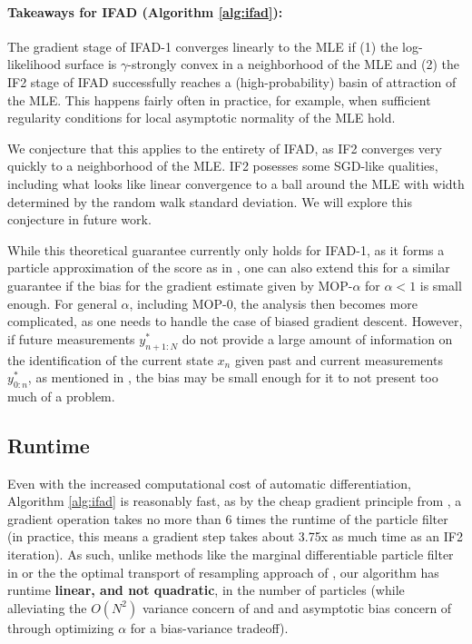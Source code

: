 \documentclass{article}
\begin{document}
\paragraph{Takeaways for IFAD (Algorithm \ref{alg:ifad}):}

The gradient stage of IFAD-1 converges linearly to the MLE if (1) the log-likelihood surface is $\gamma$-strongly convex in a neighborhood of the MLE and (2) the IF2 stage of IFAD successfully reaches a (high-probability) basin of attraction of the MLE. This happens fairly often in practice, for example, when sufficient regularity conditions for local asymptotic normality of the MLE hold.

We conjecture that this applies to the entirety of IFAD, as IF2 converges very quickly to a neighborhood of the MLE. IF2 posesses some SGD-like qualities, including what looks like linear convergence to a ball around the MLE with width determined by the random walk standard deviation. We will explore this conjecture in future work.

While this theoretical guarantee currently only holds for IFAD-1, as it forms a particle approximation of the score as in \cite{poyiadjis11}, one can also extend this for a similar guarantee if the bias for the gradient estimate given by MOP-$\alpha$ for $\alpha < 1$ is small enough. For general $\alpha$, including MOP-0, the analysis then becomes more complicated, as one needs to handle the case of biased gradient descent. However, if future measurements $y_{n+1:N}^*$ do not provide a large amount of information on the identification of the current state $x_n$ given past and current measurements $y_{0:n}^*$, as mentioned in \cite{corenflos21}, the bias may be small enough for it to not present too much of a problem.

\subsection{Runtime}

Even with the increased computational cost of automatic differentiation, Algorithm \ref{alg:ifad} is reasonably fast, as by the cheap gradient principle from \cite{kakade2019provably}, a gradient operation takes no more than 6 times the runtime of the particle filter (in practice, this means a gradient step takes about 3.75x as much time as an IF2 iteration). As such, unlike methods like the marginal differentiable particle filter in \cite{scibior2021dpf} or the the optimal transport of resampling approach of \cite{corenflos21}, our algorithm has runtime \textbf{linear, and not quadratic}, in the number of particles (while alleviating the $O(N^2)$ variance concern of \cite{poyiadjis11} and \cite{corenflos2021ot} and asymptotic bias concern of \cite{blei2018vsmc} through optimizing $\alpha$ for a bias-variance tradeoff). 
\end{document}
